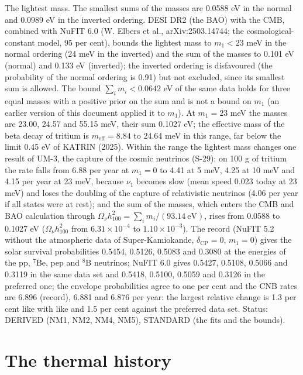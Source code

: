 \documentclass[
  10pt,
]{article}
\begin{document}
The lightest mass. The smallest sums of the masses are 0.0588 eV in the
normal and 0.0989 eV in the inverted ordering. DESI DR2 (the BAO) with
the CMB, combined with NuFIT 6.0 (W. Elbers et al., arXiv:2503.14744;
the cosmological-constant model, 95 per cent), bounds the lightest mass
to \(m_1 < 23\) meV in the normal ordering (24 meV in the inverted) and
the sum of the masses to 0.101 eV (normal) and 0.133 eV (inverted); the
inverted ordering is disfavoured (the probability of the normal ordering
is 0.91) but not excluded, since its smallest sum is allowed. The bound
\(\sum_i m_i < 0.0642\) eV of the same data holds for three equal masses
with a positive prior on the sum and is not a bound on \(m_1\) (an
earlier version of this document applied it to \(m_1\)). At \(m_1 = 23\)
meV the masses are 23.00, 24.57 and 55.15 meV, their sum 0.1027 eV; the
effective mass of the beta decay of tritium is
\(m_{\mathrm{eff}} = 8.84\) to 24.64 meV in this range, far below the
limit 0.45 eV of KATRIN (2025). Within the range the lightest mass
changes one result of UM-3, the capture of the cosmic neutrinos (S-29):
on 100 g of tritium the rate falls from 6.88 per year at \(m_1 = 0\) to
4.41 at 5 meV, 4.25 at 10 meV and 4.15 per year at 23 meV, because
\(\nu_1\) becomes slow (mean speed 0.023 today at 23 meV) and loses the
doubling of the capture of relativistic neutrinos (4.06 per year if all
states were at rest); and the sum of the masses, which enters the CMB
and BAO calculation through
\(\Omega_\nu h_{100}^2 = \sum_i m_i/(93.14\ \text{eV})\), rises from
0.0588 to 0.1027 eV (\(\Omega_\nu h_{100}^2\) from \(6.31\times10^{-4}\)
to \(1.10\times10^{-3}\)). The record (NuFIT 5.2 without the atmospheric
data of Super-Kamiokande, \(\delta_{\mathrm{CP}} = 0\), \(m_1 = 0\))
gives the solar survival probabilities 0.5454, 0.5126, 0.5083 and 0.3080
at the energies of the pp, \(^7\)Be, pep and \(^8\)B neutrinos; NuFIT
6.0 gives 0.5427, 0.5108, 0.5066 and 0.3119 in the same data set and
0.5418, 0.5100, 0.5059 and 0.3126 in the preferred one; the envelope
probabilities agree to one per cent and the CNB rates are 6.896
(record), 6.881 and 6.876 per year: the largest relative change is 1.3
per cent like with like and 1.5 per cent against the preferred data set.
Status: DERIVED (NM1, NM2, NM4, NM5), STANDARD (the fits and the
bounds).

\hypertarget{the-thermal-history}{%
\section{The thermal history}\label{the-thermal-history}}
\end{document}
